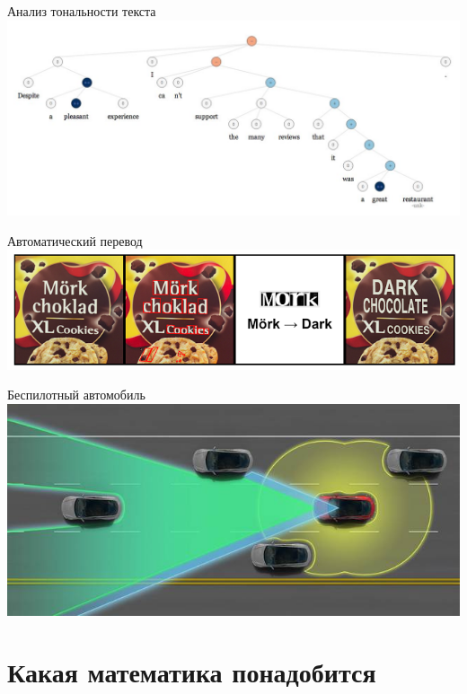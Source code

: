 \documentclass[10pt]{beamer}
\begin{document}
{
\begin{frame}{Анализ тональности текста}
  \centering
  \includegraphics[width=\linewidth, height=\textheight, keepaspectratio]{images/sentiment}\\
\end{frame}
}

{
\begin{frame}{Автоматический перевод}
  \centering
  \includegraphics[width=0.9 \linewidth, height=0.9 \textheight, keepaspectratio]{images/translation}\\
\end{frame}
}

{
\begin{frame}{Беспилотный автомобиль}
  \centering
  \includegraphics[width=0.9 \linewidth, height=0.9 \textheight, keepaspectratio]{images/self_driving}\\
\end{frame}
}

\section{Какая математика понадобится}
\end{document}
